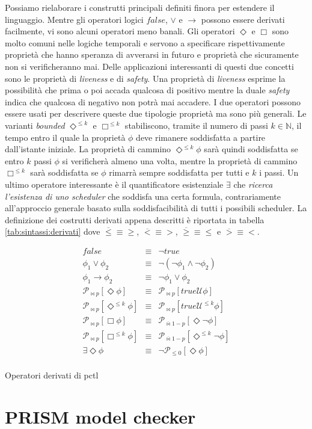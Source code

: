 Possiamo rielaborare i construtti principali definiti finora per estendere il linguaggio. Mentre gli operatori logici $false$, $\vee$ e $\rightarrow$ possono essere derivati facilmente, vi sono alcuni operatori meno banali. Gli operatori $\Diamond$ e $\Box$ sono molto comuni nelle logiche temporali e servono a specificare rispettivamente proprietà che hanno speranza di avverarsi in futuro e proprietà che sicuramente non si verificheranno mai. Delle applicazioni interessanti di questi due concetti sono le proprietà di \emph{liveness} e di \emph{safety}. Una proprietà di \emph{liveness} esprime la possibilità che prima o poi accada qualcosa di positivo mentre la duale \emph{safety} indica che qualcosa di negativo non potrà mai accadere. I due operatori possono essere usati per descrivere queste due tipologie proprietà ma sono più generali. 
Le varianti \emph{bounded} $\Diamond^{\leq k}$ e $\Box^{\leq k}$ stabiliscono, tramite il numero di passi $k \in \mathbb{N}$, il tempo entro il quale la proprietà $\phi$ deve rimanere soddisfatta a partire dall'istante iniziale. La proprietà di cammino $\Diamond^{\leq k}\phi$ sarà quindi soddisfatta se entro $k$ passi $\phi$ si verificherà almeno una volta, mentre la proprietà di cammino $\Box^{\leq k}$ sarà soddisfatta se $\phi$ rimarrà sempre soddisfatta per tutti e $k$ i passi. 
Un ultimo operatore interessante è il quantificatore esistenziale $\exists$ che \emph{ricerca l'esistenza di uno scheduler} che soddisfa una certa formula, contrariamente all'approccio generale basato sulla soddisfacibilità di tutti i possibili scheduler.
La definizione dei costrutti derivati appena descritti è riportata in tabella \ref{tab:sintassi:derivati} dove $\overline\leq \equiv \geq$, $\overline < \equiv >$, $\overline\geq \equiv \leq$ e $\overline > \equiv <$.
\begin{table}[htbp!]
$$
\begin{array}{rcl}
	false & \equiv & \neg true \\
	\phi_1 \vee \phi_2 & \equiv & \neg(\neg\phi_1 \wedge \neg\phi_2) \\
	\phi_1 \rightarrow \phi_2 & \equiv & \neg\phi_1 \vee \phi_2 \\
	\mathcal{P}_{\bowtie p}[\Diamond \phi] & \equiv & \mathcal{P}_{\bowtie p}[true \mathcal{U} \phi] \\
	\mathcal{P}_{\bowtie p}[\Diamond^{\leq k} \phi] & \equiv & \mathcal{P}_{\bowtie p}[true \mathcal{U}^{\leq k} \phi] \\
	\mathcal{P}_{\bowtie p}[\Box \phi] & \equiv & \mathcal{P}_{\overline\bowtie 1-p}[\Diamond \neg \phi] \\
	\mathcal{P}_{\bowtie p}[\Box^{\leq k} \phi] & \equiv & \mathcal{P}_{\overline\bowtie 1-p}[\Diamond^{\leq k} \neg \phi] \\
	\exists\Diamond\phi & \equiv & \neg \mathcal{P}_{\leq 0}[\Diamond\phi] \\
\end{array}
$$
\caption{Operatori derivati di \ac{pctl}}
\label{tab:sintassi:derivati}
\end{table}

\section{PRISM model checker}



